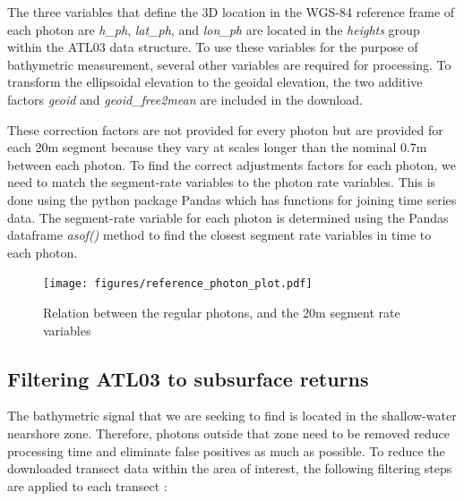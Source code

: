 The three variables that define the 3D location in the WGS-84 reference frame of each photon are \emph{h\_ph}, \emph{lat\_ph}, and \emph{lon\_ph} are located in the \emph{heights} group within the ATL03 data structure. To use these variables for the purpose of bathymetric measurement, several other variables are required for processing. To transform the ellipsoidal elevation to the geoidal elevation, the two additive factors \emph{geoid} and \emph{geoid\_free2mean} are included in the download.

These correction factors are not provided for every photon but are provided for each 20m segment because they vary at scales longer than the nominal 0.7m between each photon. To find the correct adjustments factors for each photon, we need to match the segment-rate variables to the photon rate variables. This is done using the python package Pandas \parencite{jeff_reback_2022_6408044,mckinney-proc-scipy-2010} which has functions for joining time series data.  The segment-rate variable for each photon is determined using the Pandas dataframe \emph{asof()} method to find the closest segment rate variables in time to each photon. 

\begin{figure}[h]
    \centering
    \texttt{[image: figures/reference\_photon\_plot.pdf]}
    \caption{Relation between the regular photons, and the 20m segment rate variables}
    \label{fig:reference-photon_match} 
\end{figure}

\subsection{Filtering ATL03 to subsurface returns}

The bathymetric signal that we are seeking to find is located in the shallow-water nearshore zone. Therefore, photons outside that zone need to be removed reduce processing time and eliminate false positives as much as possible. To reduce the downloaded transect data within the area of interest, the following filtering steps are applied to each transect :

